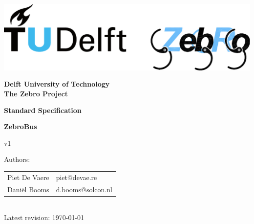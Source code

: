 \documentclass[a4paper, twoside]{article}
\begin{document}
\begin{titlepage}
\begin{center}
\includegraphics[width=14cm]{fig/combinedLogo.pdf} \\ \vspace{1cm}

\begin{LARGE}
\textbf{Delft University of Technology}\\
\textbf{The Zebro Project}\\ \vspace{1cm}

\textbf{Standard Specification}\\

\vspace{0.5cm}
 

\end{LARGE}
\vspace{1em}
\begin{Huge}
\textbf{ZebroBus}\\
\end{Huge}
v1

\vspace{1 cm}
Authors:

\begin{tabular}{l l}
Piet De Vaere	    &piet@devae.re\\
Dani\"el Booms		&d.booms@solcon.nl\\
\end{tabular}\\[2em]

Latest revision:
\today
\end{center}
\vfill
\end{titlepage}

\cleardoublepage
\tableofcontents
\listoftables




\end{document}
